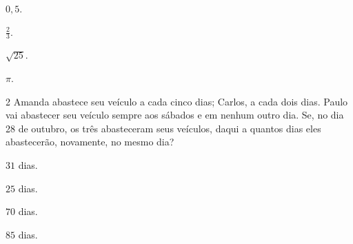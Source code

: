 \begin{escolha}
\item $0,5$.

\item $\frac{2}{3}$.

\item $\sqrt{25}$.

\item $\pi$.
\end{escolha}



\num{2}  Amanda abastece seu veículo a cada cinco dias; Carlos, a cada dois dias.
Paulo vai abastecer seu veículo sempre aos sábados e em nenhum outro
dia. Se, no dia 28 de outubro, os três abasteceram seus veículos, daqui a
quantos dias eles abastecerão, novamente, no mesmo dia?

\begin{escolha}
\item $31$ dias.
\item $25$ dias.
\item $70$ dias.
\item $85$ dias.
\end{escolha}


